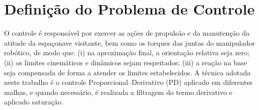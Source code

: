 \section{Definição do Problema de Controle}
\label{sec:definicao_problema_controle}

O controle é responsável por exercer as ações de propulsão e da manutenção da atitude da espaçonave visitante, bem como os torques das juntas do manipulador robótico, de modo que:
(i) na aproximação final, a orientação relativa seja zero;
(ii) os limites cinemáticos e dinâmicos sejam respeitados;
(iii) a reação na base seja compensada de forma a atender os limites estabelecidos.  
A técnica adotada neste trabalho é o controle Proporcional--Derivativo (PD) aplicado em diferentes malhas, e quando necessário, é realizada a filtragem do termo derivativo e aplicado saturação.






